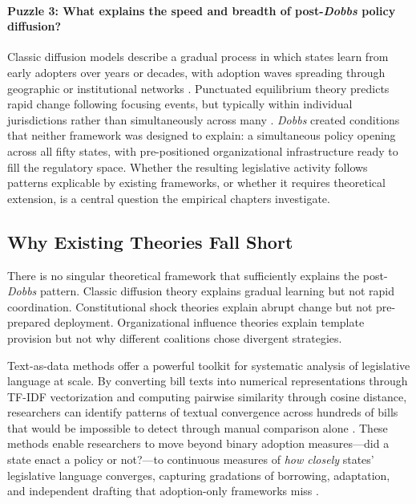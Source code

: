 \paragraph{Puzzle 3: What explains the speed and breadth of post-\emph{Dobbs} policy diffusion?}

Classic diffusion models describe a gradual process in which states learn from early adopters over years or decades, with adoption waves spreading through geographic or institutional networks \parencite{walkerDiffusionInnovationsAmerican1969,berryStateLotteryAdoptions1990,shipanMechanismsPolicyDiffusion2008a}. Punctuated equilibrium theory predicts rapid change following focusing events, but typically within individual jurisdictions rather than simultaneously across many \parencite{baumgartner_jones_1993}. \emph{Dobbs} created conditions that neither framework was designed to explain: a simultaneous policy opening across all fifty states, with pre-positioned organizational infrastructure ready to fill the regulatory space. Whether the resulting legislative activity follows patterns explicable by existing frameworks, or whether it requires theoretical extension, is a central question the empirical chapters investigate.

\subsection{Why Existing Theories Fall Short}

There is no singular theoretical framework that sufficiently explains the post-\textit{Dobbs} pattern. Classic diffusion theory explains gradual learning but not rapid coordination. Constitutional shock theories explain abrupt change but not pre-prepared deployment. Organizational influence theories explain template provision but not why different coalitions chose divergent strategies.

Text-as-data methods offer a powerful toolkit for systematic analysis of legislative language at scale. By converting bill texts into numerical representations through TF-IDF vectorization and computing pairwise similarity through cosine distance, researchers can identify patterns of textual convergence across hundreds of bills that would be impossible to detect through manual comparison alone \parencite{wilkersonTracingFlowPolicy2015,linderTextPolicyMeasuring2020}. These methods enable researchers to move beyond binary adoption measures---did a state enact a policy or not?---to continuous measures of \textit{how closely} states' legislative language converges, capturing gradations of borrowing, adaptation, and independent drafting that adoption-only frameworks miss \parencite{boehmkeStatePolicyInnovativeness2012a}.

